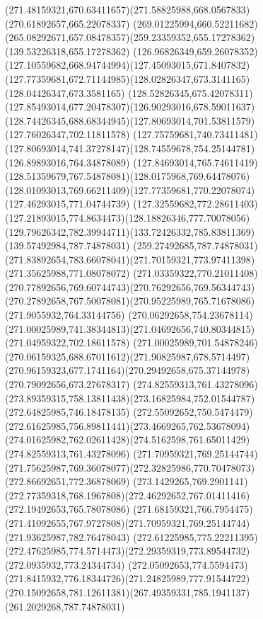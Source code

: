 {{\curveto(271.48159321,670.63411657)(271.58825988,668.0567833)(270.61892657,665.22078337)
\curveto(269.01225994,660.52211682)(265.08292671,657.08478357)(259.23359352,655.17278362)
\lineto(139.53226318,655.17278362)
\curveto(126.96826349,659.26078352)(127.10559682,668.94744994)(127.45093015,671.8407832)
\curveto(127.77359681,672.71144985)(128.02826347,673.3141165)(128.04426347,673.3581165)
\curveto(128.52826345,675.42078311)(127.85493014,677.20478307)(126.90293016,678.59011637)
\curveto(128.74426345,688.68344945)(127.80693014,701.53811579)(127.76026347,702.11811578)
\lineto(127.75759681,740.73411481)
\curveto(127.80693014,741.37278147)(128.74559678,754.25144781)(126.89893016,764.34878089)
\curveto(127.84693014,765.74611419)(128.51359679,767.54878081)(128.0175968,769.64478076)
\curveto(128.01093013,769.66211409)(127.77359681,770.22078074)(127.46293015,771.04744739)
\curveto(127.32559682,772.28611403)(127.21893015,774.8634473)(128.18826346,777.70078056)
\curveto(129.79626342,782.39944711)(133.72426332,785.83811369)(139.57492984,787.74878031)
\lineto(259.27492685,787.74878031)
\curveto(271.83892654,783.66078041)(271.70159321,773.97411398)(271.35625988,771.08078072)
\curveto(271.03359322,770.21011408)(270.77892656,769.60744743)(270.76292656,769.56344743)
\curveto(270.27892658,767.50078081)(270.95225989,765.71678086)(271.9055932,764.33144756)
\curveto(270.06292658,754.23678114)(271.00025989,741.38344813)(271.04692656,740.80344815)
\lineto(271.04959322,702.18611578)
\curveto(271.00025989,701.54878246)(270.06159325,688.67011612)(271.90825987,678.5714497)
\curveto(270.96159323,677.1741164)(270.29492658,675.37144978)(270.79092656,673.27678317)
\moveto(274.82559313,761.43278096)
\curveto(273.89359315,758.13811438)(273.16825984,752.01544787)(272.64825985,746.18478135)
\curveto(272.55092652,750.5474479)(272.61625985,756.89811441)(273.4669265,762.53678094)
\curveto(274.01625982,762.02611428)(274.5162598,761.65011429)(274.82559313,761.43278096)
\moveto(271.70959321,769.25144744)
\curveto(271.75625987,769.36078077)(272.32825986,770.70478073)(272.86692651,772.36878069)
\lineto(273.1429265,769.2901141)
\curveto(272.77359318,768.1967808)(272.46292652,767.01411416)(272.19492653,765.78078086)
\curveto(271.68159321,766.7954475)(271.41092655,767.9727808)(271.70959321,769.25144744)
\moveto(271.93625987,782.76478043)
\lineto(272.61225985,775.22211395)
\curveto(272.47625985,774.5714473)(272.29359319,773.89544732)(272.0935932,773.24344734)
\curveto(272.05092653,774.5594473)(271.8415932,776.18344726)(271.24825989,777.91544722)
\curveto(270.15092658,781.12611381)(267.49359331,785.1941137)(261.2029268,787.74878031)
}}
